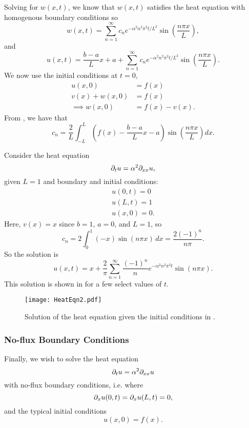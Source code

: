 Solving for $w(x,t)$, we know that $w(x,t)$ satisfies the heat equation with homogenous boundary conditions so 
\[
w(x,t) = \sum_{n=1}^{\infty} c_n e^{-\alpha^2 n^2 \pi^2 t/L^2} \sin\left(\frac{n\pi x}{L}\right),
\]
and
\begin{equation}
	u(x,t) = \frac{b-a}{L}x + a + \sum_{n=1}^{\infty} c_n e^{-\alpha^2 n^2 \pi^2 t/L^2} \sin\left(\frac{n\pi x}{L}\right).
\end{equation}
We now use the initial conditions at $t=0$, 
\begin{align*}
	u(x,0) &= f(x) \\
	v(x) + w(x,0) &= f(x) \\
	\implies w(x,0) &= f(x) - v(x).
\end{align*}
From , we have that 
\begin{equation}
	c_n = \frac{2}{L} \int_{-L}^L \left( f(x) - \frac{b-a}{L}x - a \right) \sin{\left(\frac{n \pi x}{L} \right)} dx.
\end{equation}

\begin{eg}\label{eg:heateqn2}
	Consider the heat equation
	\[
	\partial_t u = \alpha^2 \partial_{xx} u,
	\]
	given $L=1$ and boundary and initial conditions:
	\begin{align*}
		u(0,t) = 0 \\
		u(L,t) = 1 \\
		u(x,0) = 0.
	\end{align*} 
	Here, $v(x) = x$ since $b=1$, $a=0$, and $L=1$, so
	\[
	c_n = 2 \int_{0}^1 (-x) \sin{\left(n \pi x \right)} \,dx = \frac{2(-1)^n}{n \pi}.
	\]
	So the solution is
	\[
	u(x,t) = x + \frac{2}{\pi} \sum_{n=1}^{\infty} \frac{(-1)^n}{n} e^{-\alpha^2 n^2 \pi^2 t}\sin{\left(n \pi x \right)}.
	\]
	This solution is shown in  for a few select values of $t$.
\end{eg}

\begin{figure}[!ht]
	\centering
	\texttt{[image: HeatEqn2.pdf]}
	\caption{Solution of the heat equation given the initial conditions in .}
	\label{fig:heateqneg2}
\end{figure}

\subsubsection{No-flux Boundary Conditions}

Finally, we wish to solve the heat equation
\[
\partial_t u = \alpha^2 \partial_{xx} u
\] 
with no-flux boundary conditions, i.e. where
\[
\partial_x u(0,t) = \partial_x u(L,t) = 0,
\]
and the typical initial conditions
\[
u(x,0) = f(x).
\]

